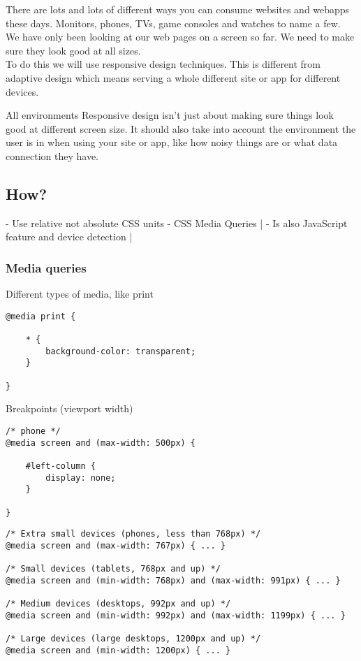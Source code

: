 There are lots and lots of different ways you can consume websites and webapps these days. Monitors, phones, TVs, game consoles and watches to name a few.
\\
We have only been looking at our web pages on a screen so far. We need to make sure they look good at all sizes.
\\
To do this we will use responsive design techniques. This is different from adaptive design which means serving a whole different site or app for different devices.

\begin{infobox}{All environments}
    Responsive design isn't just about making sure things look good at different screen size. It should also take into account the environment the user is in when using your site or app, like how noisy things are or what data connection they have.
\end{infobox}

\subsection{How?}

- Use relative not absolute CSS units
- CSS Media Queries |
- Is also JavaScript feature and device detection |


\subsubsection{Media queries}

Different types of media, like print

\begin{verbatim}
@media print {

    * {
        background-color: transparent;
    }

}
\end{verbatim}

Breakpoints (viewport width)

\begin{verbatim}
/* phone */
@media screen and (max-width: 500px) {

    #left-column {
        display: none;
    }

}
\end{verbatim}


\begin{verbatim}
/* Extra small devices (phones, less than 768px) */
@media screen and (max-width: 767px) { ... }

/* Small devices (tablets, 768px and up) */
@media screen and (min-width: 768px) and (max-width: 991px) { ... }

/* Medium devices (desktops, 992px and up) */
@media screen and (min-width: 992px) and (max-width: 1199px) { ... }

/* Large devices (large desktops, 1200px and up) */
@media screen and (min-width: 1200px) { ... }
\end{verbatim}


